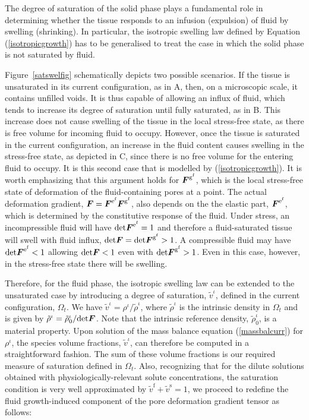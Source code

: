 \noindent The degree of saturation of the solid phase plays a
fundamental role in determining whether the tissue responds to an
infusion (expulsion) of fluid by swelling (shrinking). In 
particular, the isotropic swelling law defined by Equation
(\ref{isotropicgrowth}) has to be generalised to treat the case in
which the solid phase is not saturated by fluid.

Figure~\ref{satswelfig} schematically depicts two possible
scenarios. If the tissue is unsaturated in its current configuration,
as in A, then, on a microscopic scale, it 
contains unfilled voids. It is thus capable of allowing an influx of
fluid, which tends to increase its degree of saturation until fully
saturated, as in  B. This increase 
does not cause swelling of the tissue in the local stress-free state, as
there is free volume for 
incoming fluid to occupy. However, once the tissue is
saturated in the current configuration, an increase in the
fluid content causes swelling in the stress-free state, as depicted in
C, since there is no free volume for the 
entering fluid to occupy. It is this second case that is modelled by
(\ref{isotropicgrowth}). It is worth emphasizing that this argument
holds for $\mbox{\boldmath$ F$}^{\mathrm{g}^\mathrm{f}}$, which is the local
stress-free state of deformation of the fluid-containing pores at a point. The
actual deformation gradient, $\mbox{\boldmath$ F$} =
\mbox{\boldmath$ F$}^{\mathrm{e}^\mathrm{f}}\mbox{\boldmath$ F$}^{\mathrm{g}^\mathrm{f}}$, also depends
on the the elastic part, $\mbox{\boldmath$ F$}^{\mathrm{e}^\mathrm{f}}$, which is
determined by the constitutive response of the fluid. Under stress, an
incompressible fluid will have
$\mathrm{det}\mbox{\boldmath$ F$}^{\mathrm{e}^\mathrm{f}} = 1$ and therefore a
fluid-saturated tissue will swell with fluid influx, $\mathrm{det}\mbox{\boldmath$ F$}
= \mathrm{det}\mbox{\boldmath$ F$}^{\mathrm{g}^\mathrm{f}} > 1$. A compressible fluid
may have $\mathrm{det}\mbox{\boldmath$ F$}^{\mathrm{e}^\mathrm{f}} < 1$ allowing
$\mathrm{det}\mbox{\boldmath$ F$} < 1$ even with
$\mathrm{det}\mbox{\boldmath$ F$}^{\mathrm{g}^\mathrm{f}} >1$. Even in this case,
however, in the stress-free state there will be swelling.

Therefore, for the fluid phase, the isotropic swelling law can be
extended to the unsaturated case by 
introducing a degree of saturation, $\tilde{v}^\iota$, defined in the
current configuration, $\Omega_t$. We have $\tilde{v}^\iota =
\rho^\iota/\tilde{\rho}^\iota$, where 
$\tilde{\rho}^\iota$ is the intrinsic density in $\Omega_t$ and is
given by $\tilde{\rho}^\iota =
\tilde{\rho}^\iota_0/\mathrm{det}\mbox{\boldmath$ F$}$. Note that the intrinsic
reference density, $\tilde{\rho}^\iota_0$, is a material property. Upon
solution of the 
mass balance equation (\ref{massbalcurr}) for $\rho^\iota$, the
species volume fractions, $\tilde{v}^\iota$, can therefore be computed
in a straightforward fashion. The sum of these
volume fractions is our required measure of saturation defined in
$\Omega_t$. Also, recognizing
that for the dilute solutions obtained with
physiologically-relevant solute concentrations, the saturation
condition is very well approximated by $\tilde{v}^\mathrm{f} +
\tilde{v}^\mathrm{s} = 1$, we proceed to
redefine the fluid growth-induced component of the pore deformation gradient
tensor as follows:

